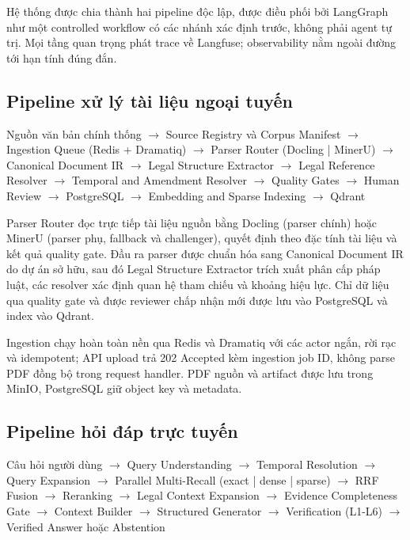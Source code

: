 \documentclass[12pt,a4paper]{article}
\begin{document}
Hệ thống được chia thành hai pipeline độc lập, được điều phối bởi LangGraph như một controlled workflow có các nhánh xác định trước, không phải agent tự trị. Mọi tầng quan trọng phát trace về Langfuse; observability nằm ngoài đường tới hạn tính đúng đắn.

\subsection{Pipeline xử lý tài liệu ngoại tuyến}

\begin{center}
\small
Nguồn văn bản chính thống
$\rightarrow$ Source Registry và Corpus Manifest
$\rightarrow$ Ingestion Queue (Redis + Dramatiq)
$\rightarrow$ Parser Router (Docling | MinerU)
$\rightarrow$ Canonical Document IR
$\rightarrow$ Legal Structure Extractor
$\rightarrow$ Legal Reference Resolver
$\rightarrow$ Temporal and Amendment Resolver
$\rightarrow$ Quality Gates
$\rightarrow$ Human Review
$\rightarrow$ PostgreSQL
$\rightarrow$ Embedding and Sparse Indexing
$\rightarrow$ Qdrant
\end{center}

Parser Router đọc trực tiếp tài liệu nguồn bằng Docling (parser chính) hoặc MinerU (parser phụ, fallback và challenger), quyết định theo đặc tính tài liệu và kết quả quality gate. Đầu ra parser được chuẩn hóa sang Canonical Document IR do dự án sở hữu, sau đó Legal Structure Extractor trích xuất phân cấp pháp luật, các resolver xác định quan hệ tham chiếu và khoảng hiệu lực. Chỉ dữ liệu qua quality gate và được reviewer chấp nhận mới được lưu vào PostgreSQL và index vào Qdrant.

Ingestion chạy hoàn toàn nền qua Redis và Dramatiq với các actor ngắn, rời rạc và idempotent; API upload trả 202 Accepted kèm ingestion job ID, không parse PDF đồng bộ trong request handler. PDF nguồn và artifact được lưu trong MinIO, PostgreSQL giữ object key và metadata.

\subsection{Pipeline hỏi đáp trực tuyến}

\begin{center}
\small
Câu hỏi người dùng
$\rightarrow$ Query Understanding
$\rightarrow$ Temporal Resolution
$\rightarrow$ Query Expansion
$\rightarrow$ Parallel Multi-Recall (exact | dense | sparse)
$\rightarrow$ RRF Fusion
$\rightarrow$ Reranking
$\rightarrow$ Legal Context Expansion
$\rightarrow$ Evidence Completeness Gate
$\rightarrow$ Context Builder
$\rightarrow$ Structured Generator
$\rightarrow$ Verification (L1-L6)
$\rightarrow$ Verified Answer hoặc Abstention
\end{center}
\end{document}
